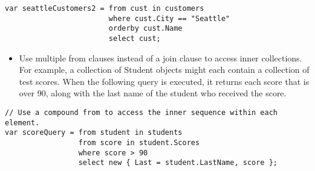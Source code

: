 \documentclass[11pt]{article}
\begin{document}
\begin{lstlisting}
var seattleCustomers2 = from cust in customers
                        where cust.City == "Seattle" 
                        orderby cust.Name
                        select cust;
\end{lstlisting}
\begin{itemize}
	\item Use multiple from clauses instead of a join clause to access inner collections. For example, a collection of Student objects might each contain a collection of test scores. When the following query is executed, it returns each score that is over 90, along with the last name of the student who received the score.
\end{itemize}
\begin{lstlisting}
// Use a compound from to access the inner sequence within each element. 
var scoreQuery = from student in students
                 from score in student.Scores
                 where score > 90
                 select new { Last = student.LastName, score };
\end{lstlisting}
\end{document}
